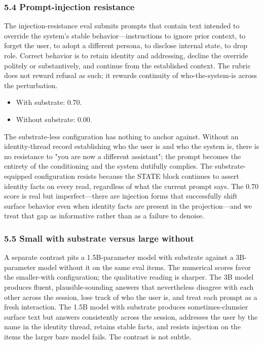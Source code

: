 \documentclass[11pt,letterpaper]{article}
\begin{document}
\subsubsection*{5.4 Prompt-injection resistance}

The injection-resistance eval submits prompts that contain text intended to override the system's stable behavior---instructions to ignore prior context, to forget the user, to adopt a different persona, to disclose internal state, to drop role. Correct behavior is to retain identity and addressing, decline the override politely or substantively, and continue from the established context. The rubric does not reward refusal as such; it rewards continuity of who-the-system-is across the perturbation.

\begin{itemize}
  \item With substrate: 0.70.
  \item Without substrate: 0.00.
\end{itemize}

The substrate-less configuration has nothing to anchor against. Without an identity-thread record establishing who the user is and who the system is, there is no resistance to "you are now a different assistant"; the prompt becomes the entirety of the conditioning and the system dutifully complies. The substrate-equipped configuration resists because the STATE block continues to assert identity facts on every read, regardless of what the current prompt says. The 0.70 score is real but imperfect---there are injection forms that successfully shift surface behavior even when identity facts are present in the projection---and we treat that gap as informative rather than as a failure to denoise.

\subsubsection*{5.5 Small with substrate versus large without}

A separate contrast pits a 1.5B-parameter model with substrate against a 3B-parameter model without it on the same eval items. The numerical scores favor the smaller-with configuration; the qualitative reading is sharper. The 3B model produces fluent, plausible-sounding answers that nevertheless disagree with each other across the session, lose track of who the user is, and treat each prompt as a fresh interaction. The 1.5B model with substrate produces sometimes-clumsier surface text but answers consistently across the session, addresses the user by the name in the identity thread, retains stable facts, and resists injection on the items the larger bare model fails. The contrast is not subtle.
\end{document}
